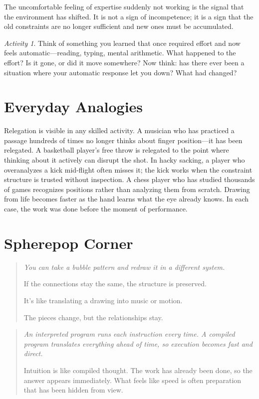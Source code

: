 \documentclass[11pt]{book}
\theoremstyle{definition}
\theoremstyle{remark}
\newtheorem{activity}[definition]{Activity}
\newenvironment{literaryaside}
  {\begin{quote}\small\itshape}
  {\end{quote}}
\newenvironment{spherepopjunior}
  {\begin{quote}\small\itshape}
  {\end{quote}}
\begin{document}
The uncomfortable feeling of expertise suddenly not working is the signal
that the environment has shifted. It is not a sign of incompetence; it is
a sign that the old constraints are no longer sufficient and new ones must
be accumulated.

\begin{activity}
Think of something you learned that once required effort and now feels
automatic---reading, typing, mental arithmetic. What happened to the
effort? Is it gone, or did it move somewhere? Now think: has there ever
been a situation where your automatic response let you down? What had
changed?
\end{activity}

\section*{Everyday Analogies}

Relegation is visible in any skilled activity. A musician who has
practiced a passage hundreds of times no longer thinks about finger
position---it has been relegated. A basketball player's free throw
is relegated to the point where thinking about it actively can disrupt
the shot. In hacky sacking, a player who overanalyzes a kick mid-flight
often misses it; the kick works when the constraint structure is trusted
without inspection. A chess player who has studied thousands of games
recognizes positions rather than analyzing them from scratch. Drawing
from life becomes faster as the hand learns what the eye already knows.
In each case, the work was done before the moment of performance.

\section*{Spherepop Corner}

\begin{spherepopjunior}
You can take a bubble pattern and redraw it in a different system.

If the connections stay the same, the structure is preserved.

It's like translating a drawing into music or motion.

The pieces change, but the relationships stay.
\end{spherepopjunior}

\begin{literaryaside}
An interpreted program runs each instruction every time. A compiled
program translates everything ahead of time, so execution becomes fast
and direct.

Intuition is like compiled thought. The work has already been done, so
the answer appears immediately. What feels like speed is often
preparation that has been hidden from view.
\end{literaryaside}
\end{document}
